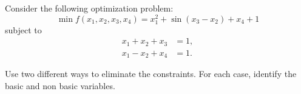 
Consider the following optimization problem:
\[
\min f(x_1,x_2,x_3,x_4)=x_1^2+\sin(x_3-x_2)+x_4+1
\]
subject to
\begin{align*}
  x_1+x_2+x_3 & =1, \\
  x_1-x_2+x_4 &=1.
\end{align*}

Use two different ways to eliminate the constraints. For each case, identify the basic and non basic variables.



